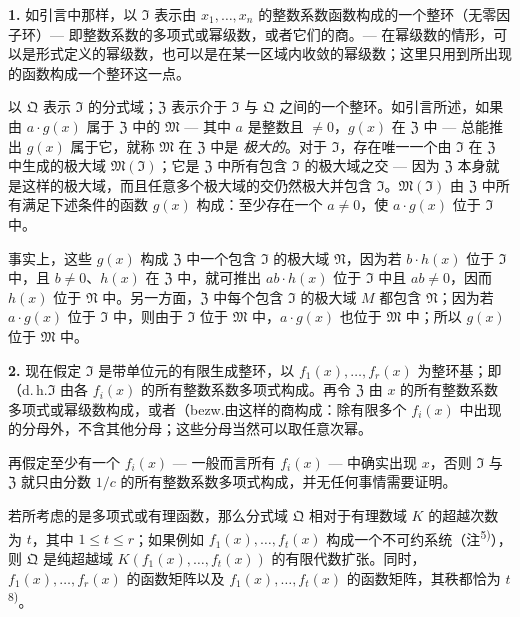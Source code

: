 \documentclass[11pt]{article}
\begin{document}
\noindent\textbf{1.}
如引言中那样，以 $\mathfrak{I}$ 表示由 $x_1,\ldots,x_n$ 的整数系数函数构成的一个整环（无零因子环）--- 即整数系数的多项式或幂级数，或者它们的商。--- 在幂级数的情形，可以是形式定义的幂级数，也可以是在某一区域内收敛的幂级数；这里只用到所出现的函数构成一个整环这一点。

以 $\mathfrak{Q}$ 表示 $\mathfrak{I}$ 的分式域；$\mathfrak{Z}$ 表示介于 $\mathfrak{I}$ 与 $\mathfrak{Q}$ 之间的一个整环。如引言所述，如果由 $a \cdot g(x)$ 属于 $\mathfrak{Z}$ 中的 $\mathfrak{M}$ --- 其中 $a$ 是整数且 $\neq 0$，$g(x)$ 在 $\mathfrak{Z}$ 中 --- 总能推出 $g(x)$ 属于它，就称 $\mathfrak{M}$ 在 $\mathfrak{Z}$ 中是 \textit{极大的}。对于 $\mathfrak{I}$，存在唯一一个由 $\mathfrak{I}$ 在 $\mathfrak{Z}$ 中生成的极大域 $\mathfrak{M}(\mathfrak{I})$；它是 $\mathfrak{Z}$ 中所有包含 $\mathfrak{I}$ 的极大域之交 --- 因为 $\mathfrak{Z}$ 本身就是这样的极大域，而且任意多个极大域的交仍然极大并包含 $\mathfrak{I}$。$\mathfrak{M}(\mathfrak{I})$ 由 $\mathfrak{Z}$ 中所有满足下述条件的函数 $g(x)$ 构成：至少存在一个 $a \neq 0$，使 $a \cdot g(x)$ 位于 $\mathfrak{I}$ 中。

事实上，这些 $g(x)$ 构成 $\mathfrak{Z}$ 中一个包含 $\mathfrak{I}$ 的极大域 $\mathfrak{N}$，因为若 $b \cdot h(x)$ 位于 $\mathfrak{I}$ 中，且 $b \neq 0$、$h(x)$ 在 $\mathfrak{Z}$ 中，就可推出 $ab \cdot h(x)$ 位于 $\mathfrak{I}$ 中且 $ab \neq 0$，因而 $h(x)$ 位于 $\mathfrak{N}$ 中。另一方面，$\mathfrak{Z}$ 中每个包含 $\mathfrak{I}$ 的极大域 $M$ 都包含 $\mathfrak{N}$；因为若 $a \cdot g(x)$ 位于 $\mathfrak{I}$ 中，则由于 $\mathfrak{I}$ 位于 $\mathfrak{M}$ 中，$a \cdot g(x)$ 也位于 $\mathfrak{M}$ 中；所以 $g(x)$ 位于 $\mathfrak{M}$ 中。

\medskip\noindent\textbf{2.}
现在假定 $\mathfrak{I}$ 是带单位元的有限生成整环，以 $f_1(x),\ldots,f_r(x)$ 为整环基；即（d.\,h.\）$\mathfrak{I}$ 由各 $f_i(x)$ 的所有整数系数多项式构成。再令 $\mathfrak{Z}$ 由 $x$ 的所有整数系数多项式或幂级数构成，或者（bezw.\）由这样的商构成：除有限多个 $f_i(x)$ 中出现的分母外，不含其他分母；这些分母当然可以取任意次幂。

再假定至少有一个 $f_i(x)$ --- 一般而言所有 $f_i(x)$ --- 中确实出现 $x$，否则 $\mathfrak{I}$ 与 $\mathfrak{Z}$ 就只由分数 $1/c$ 的所有整数系数多项式构成，并无任何事情需要证明。

若所考虑的是多项式或有理函数，那么分式域 $\mathfrak{Q}$ 相对于有理数域 $K$ 的超越次数为 $t$，其中 $1 \leq t \leq r$；如果例如 $f_1(x),\ldots,f_t(x)$ 构成一个不可约系统（注\textsuperscript{5)}），则 $\mathfrak{Q}$ 是纯超越域 $K(f_1(x),\ldots,f_t(x))$ 的有限代数扩张。同时，$f_1(x),\ldots,f_r(x)$ 的函数矩阵以及 $f_1(x),\ldots,f_t(x)$ 的函数矩阵，其秩都恰为 $t$\textsuperscript{8)}。
\end{document}

